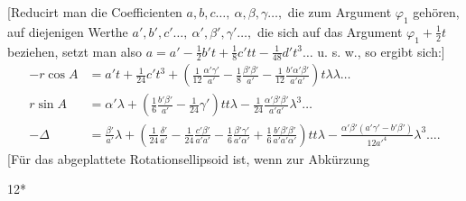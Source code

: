 [Reducirt man die Coefficienten \(a,b,c\ldots,\ \alpha,\beta,\gamma\ldots,\) die zum Argument
\(\varphi_1\) gehören, auf diejenigen Werthe \(a',b',c'\ldots,\ \alpha',\beta',\gamma'\ldots,\) die sich auf das
Argument \(\varphi_1+\tfrac12t\) beziehen, setzt man also
\(a=a'-\tfrac12b't+\tfrac18c'tt-\tfrac1{48}d't^3\ldots\)
u. s. w., so ergibt sich:]
\[
\begin{aligned}
-r\cos A&=a't+\tfrac1{24}c't^3+
\left(\tfrac1{12}\frac{\alpha'\gamma'}{a'}-\tfrac18\frac{\beta'\beta'}{a'}-\tfrac1{12}\frac{b'\alpha'\beta'}{a'a'}\right)t\lambda\lambda\ldots\\[1ex]
r\sin A&=\alpha'\lambda+
\left(\tfrac16\frac{b'\beta'}{a'}-\tfrac1{24}\gamma'\right)tt\lambda
-\tfrac1{24}\frac{\alpha'\beta'\beta'}{a'a'}\lambda^3\ldots\\[1ex]
-\Delta&=\frac{\beta'}{a'}\lambda+
\left(\tfrac1{24}\frac{\delta'}{a'}-\tfrac1{24}\frac{c'\beta'}{a'a'}-\tfrac16\frac{\beta'\gamma'}{a'\alpha'}
+\tfrac16\frac{b'\beta'\beta'}{a'a'\alpha'}\right)tt\lambda
-\frac{\alpha'\beta'(a'\gamma'-b'\beta')}{12{a'}^4}\lambda^3\ldots.
\end{aligned}
\]
[Für das abgeplattete Rotationsellipsoid ist, wenn zur Abkürzung
\par\vfill\hfill12*\par
\endgroup
\endgroup
